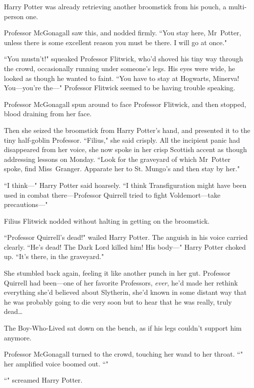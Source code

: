 Harry Potter was already retrieving another broomstick from his pouch, a multi-person one.

Professor McGonagall saw this, and nodded firmly. ``You stay here, Mr~Potter, unless there is some excellent reason you must be there. I will go at once."

``You mustn't!" squeaked Professor Flitwick, who'd shoved his tiny way through the crowd, occasionally running under someone's legs. His eyes were wide, he looked as though he wanted to faint. ``You have to stay at Hogwarts, Minerva! You—you're the—" Professor Flitwick seemed to be having trouble speaking.

Professor McGonagall spun around to face Professor Flitwick, and then stopped, blood draining from her face.

Then she seized the broomstick from Harry Potter's hand, and presented it to the tiny half-goblin Professor. ``Filius," she said crisply. All the incipient panic had disappeared from her voice, she now spoke in her crisp Scottish accent as though addressing lessons on Monday. ``Look for the graveyard of which Mr~Potter spoke, find Miss~Granger. Apparate her to St. Mungo's and then stay by her."

``I think—" Harry Potter said hoarsely. ``I think Transfiguration might have been used in combat there—Professor Quirrell tried to fight Voldemort—take precautions—"

Filius Flitwick nodded without halting in getting on the broomstick.

``Professor Quirrell's dead!" wailed Harry Potter. The anguish in his voice carried clearly. ``He's dead! The Dark Lord killed him! His body—" Harry Potter choked up. ``It's there, in the graveyard."

She stumbled back again, feeling it like another punch in her gut. Professor Quirrell had been—one of her favorite Professors, \emph{ever}, he'd made her rethink everything she'd believed about Slytherin, she'd known in some distant way that he was probably going to die very soon but to hear that he was really, truly dead{\ldots}

The Boy-Who-Lived sat down on the bench, as if his legs couldn't support him anymore.

Professor McGonagall turned to the crowd, touching her wand to her throat. ``" her amplified voice boomed out. ``"

``" screamed Harry Potter.

